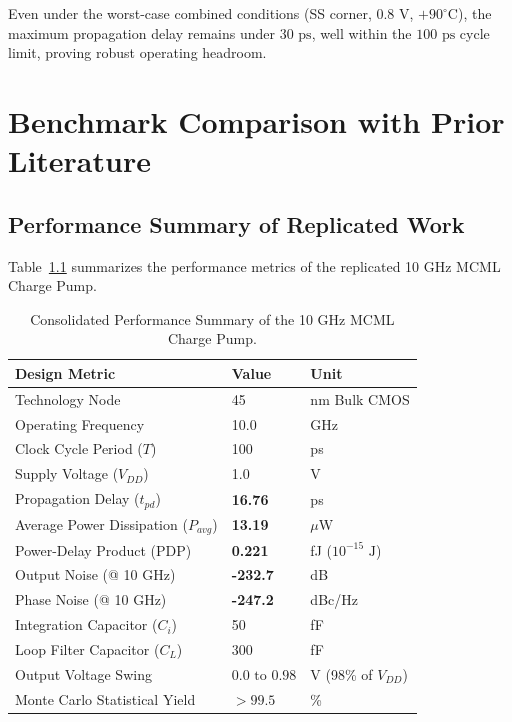 \documentclass[11pt,a4paper]{report}
\begin{document}
Even under the worst-case combined conditions (SS corner, $0.8\text{ V}$, $+90^\circ\text{C}$), the maximum propagation delay remains under $30\text{ ps}$, well within the $100\text{ ps}$ cycle limit, proving robust operating headroom.

\newpage

\chapter{Benchmark Comparison with Prior Literature}

\section{Performance Summary of Replicated Work}
Table~\ref{tab:summary_table} summarizes the performance metrics of the replicated 10 GHz MCML Charge Pump.

\begin{table}[H]
    \centering
    \caption{Consolidated Performance Summary of the 10 GHz MCML Charge Pump.}
    \label{tab:summary_table}
    \begin{tabularx}{0.85\textwidth}{Xll}
        \toprule
        \textbf{Design Metric} & \textbf{Value} & \textbf{Unit} \\
        \midrule
        Technology Node & 45 & nm Bulk CMOS \\
        Operating Frequency & 10.0 & GHz \\
        Clock Cycle Period ($T$) & 100 & ps \\
        Supply Voltage ($V_{DD}$) & 1.0 & V \\
        Propagation Delay ($t_{pd}$) & \textbf{16.76} & ps \\
        Average Power Dissipation ($P_{avg}$) & \textbf{13.19} & $\mu$W \\
        Power-Delay Product (PDP) & \textbf{0.221} & fJ ($10^{-15}\text{ J}$) \\
        Output Noise (@ 10 GHz) & \textbf{-232.7} & dB \\
        Phase Noise (@ 10 GHz) & \textbf{-247.2} & dBc/Hz \\
        Integration Capacitor ($C_i$) & 50 & fF \\
        Loop Filter Capacitor ($C_L$) & 300 & fF \\
        Output Voltage Swing & $0.0 \text{ to } 0.98$ & V (98\% of $V_{DD}$) \\
        Monte Carlo Statistical Yield & $>99.5$ & \% \\
        \bottomrule
    \end{tabularx}
\end{table}
\end{document}
